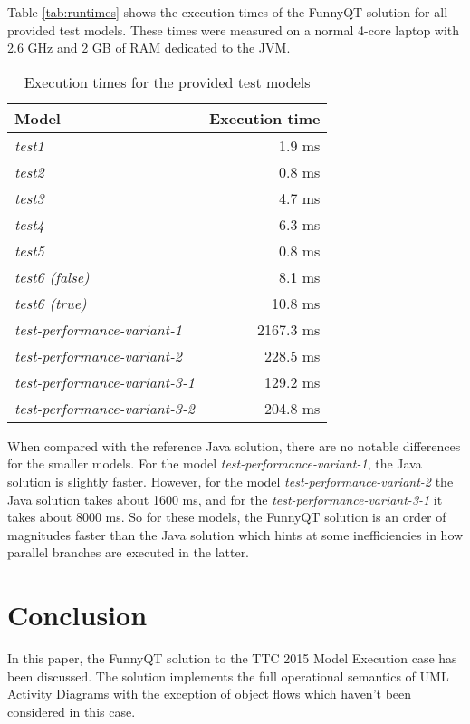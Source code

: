 \documentclass[submission]{eptcs}
\begin{document}
Table \vref{tab:runtimes} shows the execution times of the FunnyQT solution for
all provided test models.  These times were measured on a normal 4-core laptop
with 2.6 GHz and 2 GB of RAM dedicated to the JVM.

\begin{table}[h!tb]
  \centering
  \begin{tabular}{|l | r |}
    \hline
    \textbf{Model} & \textbf{Execution time}\\
    \hline
    \emph{test1} & 1.9 ms\\
    \emph{test2} & 0.8 ms\\
    \emph{test3} & 4.7 ms\\
    \emph{test4} & 6.3 ms\\
    \emph{test5} & 0.8 ms\\
    \emph{test6 (false)} & 8.1 ms\\
    \emph{test6 (true)}  & 10.8 ms\\
    \emph{test-performance-variant-1} & 2167.3 ms\\
    \emph{test-performance-variant-2} & 228.5 ms\\
    \emph{test-performance-variant-3-1} & 129.2 ms\\
    \emph{test-performance-variant-3-2} & 204.8 ms\\
    \hline
  \end{tabular}
  \caption{Execution times for the provided test models}
  \label{tab:runtimes}
\end{table}

When compared with the reference Java solution, there are no notable
differences for the smaller models.  For the model
\emph{test-performance-variant-1}, the Java solution is slightly faster.
However, for the model \emph{test-performance-variant-2} the Java solution
takes about 1600 ms, and for the \emph{test-performance-variant-3-1} it takes
about 8000 ms.  So for these models, the FunnyQT solution is an order of
magnitudes faster than the Java solution which hints at some inefficiencies in
how parallel branches are executed in the latter.


\section{Conclusion}
\label{sec:conclusion}

In this paper, the FunnyQT solution to the TTC 2015 Model Execution case has
been discussed.  The solution implements the full operational semantics of UML
Activity Diagrams with the exception of object flows which haven't been
considered in this case.
\end{document}
